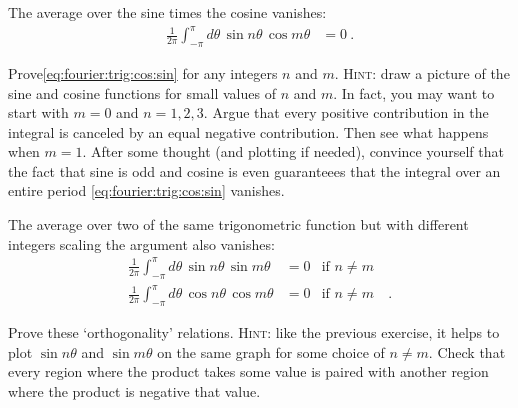 \documentclass[12pt, oneside]{report}    %
\begin{document}
The average over the sine times the cosine vanishes:
\begin{align}
    \frac{1}{2\pi}
    \int_{-\pi}^\pi d\theta\, \sin n\theta \, \cos m\theta 
    &= 0 \ .
    \label{eq:fourier:trig:cos:sin}
\end{align}
\begin{exercise}
Prove\sidenotemark \eqref{eq:fourier:trig:cos:sin} for any integers $n$ and $m$. \textsc{Hint}: draw a picture of the sine and cosine functions for small values of $n$ and $m$. In fact, you may want to start with $m=0$ and $n=1,2,3$. Argue that every positive contribution in the integral is canceled by an equal negative contribution. Then see what happens when $m=1$. After some thought (and plotting if needed), convince yourself that the fact that sine is odd and cosine is even guaranteees that the integral over an entire period \eqref{eq:fourier:trig:cos:sin} vanishes.
\end{exercise}
The average over two of the same trigonometric function but with different integers scaling the argument also vanishes:
\begin{align}
    \frac{1}{2\pi}
    \int_{-\pi}^\pi d\theta\, \sin n\theta \,\sin m\theta 
    &= 0
    &
    \text{if }n\neq m&
    \\
    \frac{1}{2\pi}
    \int_{-\pi}^\pi d\theta\, \cos n\theta \,\cos m\theta 
    &= 0 
    &
    \text{if }n\neq m&
    \ .
\end{align}
\begin{exercise}
Prove these `orthogonality' relations. \textsc{Hint}: like the previous exercise, it helps to plot $\sin n\theta$ and $\sin m\theta$ on the same graph for some choice of $n\neq m$. Check that every region where the product takes some value is paired with another region where the product is negative that value.
\end{exercise}
\end{document}

